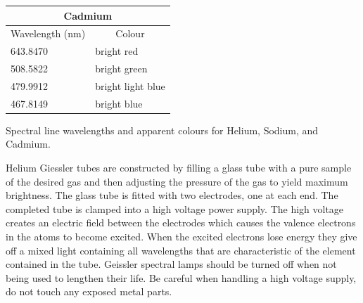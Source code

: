 \begin{margintable}
\normalsize
\begin{tabular}{|l|l|}
\hline
\multicolumn{2}{|c|}{Cadmium}                                       \\ \hline
\multicolumn{1}{|c|}{Wavelength (nm)} & \multicolumn{1}{c|}{Colour} \\ \hline
643.8470                              & bright red                  \\ \hline
508.5822                              & bright green                \\ \hline
479.9912                              & bright light blue           \\ \hline
467.8149                              & bright blue                 \\ \hline
\end{tabular}
\caption{Spectral line wavelengths and apparent colours for Helium, Sodium, and Cadmium.}
\label{tab:sp1}
\end{margintable}

Helium Giessler tubes are constructed by filling a glass tube with a pure sample of the desired gas and then adjusting the pressure of the gas to yield maximum brightness. The glass tube is fitted with two electrodes, one at each end. The completed tube is clamped into a high voltage power supply. The high voltage creates an electric field between the electrodes which causes the valence electrons in the atoms to become excited. When the excited electrons lose energy they give off a mixed light containing all wavelengths that are characteristic of the element contained in the tube. Geissler spectral lamps should be turned off when not being used to lengthen their life. Be careful when handling a high voltage supply, do not touch any exposed metal parts. 


